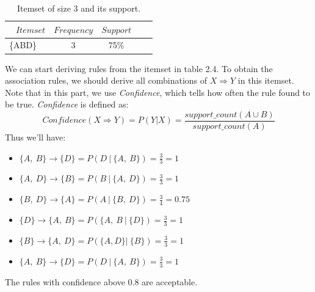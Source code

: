 \documentclass[12pt]{article}
\numberwithin{equation}{section}
\numberwithin{table}{section}
\numberwithin{figure}{section}
\begin{document}
\begin{table}[!h] \centering
	\begin{tabular}{rcccc}
		\hline
		$ Itemset $ &
		$ Frequency $ &
		$ Support $\\
		\hline
		 \{ABD\}\ \ & 3 & 75\%\\ 
		\hline
	\end{tabular}
	\caption{Itemset of size 3 and its support.}
	\label{tabconvdemo}
\end{table}
We can start deriving rules from the itemset in table 2.4. To obtain the association rules, we should derive all combinations of $X \Rightarrow Y$ in this itemset. Note that in this part, we use \textit{Confidence}, which tells how often the rule found to be true. \textit{Confidence} is defined as:
\begin{equation}
	Confidence(X \Rightarrow Y) = P(Y|X) = \frac{support\_count(A \cup B)}{support\_count(A)}
\end{equation}
Thus we'll have:
\begin{itemize}
	\item $\{A,\ B\} \rightarrow \{D\} = P(D\ |\ \{A,\ B\}) = \frac{3}{3} = 1$
	\item $\{A,\ D\} \rightarrow \{B\} = P(B\ |\ \{A,\ D\}) = \frac{3}{3} = 1$
	\item $\{B,\ D\} \rightarrow \{A\} = P(A\ |\ \{B,\ D\}) = \frac{3}{4} = 0.75$
	\item $\{D\} \rightarrow \{A,\ B\} = P(\{A,\ B\ |\ \{D\}) = \frac{3}{3} = 1$
	\item $\{B\} \rightarrow \{A,\ D\} = P(\{A, D\} |\ \{B\}) = \frac{3}{3} = 1$
	\item $\{A,\ B\} \rightarrow \{D\} = P(D\ |\ \{A,\ B\}) = \frac{3}{3} = 1$
\end{itemize}
The rules with confidence above 0.8 are acceptable.
\end{document}
